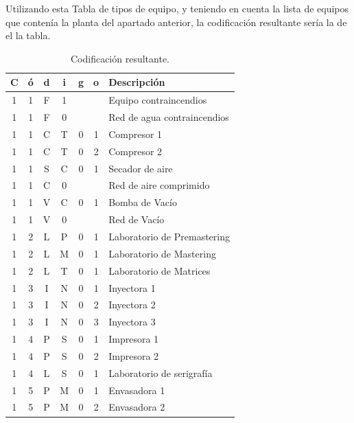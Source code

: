 \documentclass[../main]{subfiles}
\begin{document}
Utilizando esta Tabla de tipos de equipo, y teniendo en cuenta la lista
de equipos que contenía la planta del apartado anterior, la codificación resultante sería la de el la tabla.

\begin{table}[ht]
    \centering
    \begin{tabular}{|c|c|c|c|c|c|l|}\hline
C&ó&d&i&g&o&Descripción\\\hline
1&1&F&1& & &Equipo contraincendios \\
1&1&F&0& & &Red de agua contraincendios\\
1&1&C&T&0&1&Compresor 1\\
1&1&C&T&0&2&Compresor 2\\
1&1&S&C&0&1&Secador de aire\\
1&1&C&0& & &Red de aire comprimido\\
1&1&V&C&0&1&Bomba de Vacío\\
1&1&V&0& & &Red de Vacío\\
1&2&L&P&0&1&Laboratorio de Premastering\\
1&2&L&M&0&1&Laboratorio de Mastering\\
1&2&L&T&0&1&Laboratorio de Matrices\\
1&3&I&N&0&1&Inyectora 1\\
1&3&I&N&0&2&Inyectora 2\\
1&3&I&N&0&3&Inyectora 3\\
1&4&P&S&0&1&Impresora 1\\
1&4&P&S&0&2&Impresora 2\\
1&4&L&S&0&1&Laboratorio de serigrafía\\
1&5&P&M&0&1&Envasadora 1\\
1&5&P&M&0&2&Envasadora 2\\
\hline
    \end{tabular}
    \caption{Codificación resultante.}

\end{table}

\clearpage
\newpage
\end{document}
